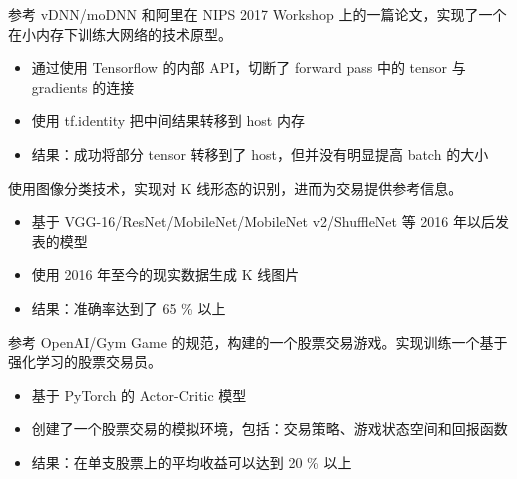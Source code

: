 \documentclass{resume}
\begin{document}
\begin{onehalfspacing}
参考 vDNN/moDNN 和阿里在 NIPS 2017 Workshop 上的一篇论文，实现了一个在小内存下训练大网络的技术原型。
\begin{itemize}
  \item 通过使用 Tensorflow 的内部 API，切断了 forward pass 中的 tensor 与 gradients 的连接
  \item 使用 tf.identity 把中间结果转移到 host 内存
  \item 结果：成功将部分 tensor 转移到了 host，但并没有明显提高 batch 的大小
\end{itemize}
\end{onehalfspacing}

\begin{onehalfspacing}
使用图像分类技术，实现对 K 线形态的识别，进而为交易提供参考信息。
\begin{itemize}
  \item 基于 VGG-16/ResNet/MobileNet/MobileNet v2/ShuffleNet 等 2016 年以后发表的模型
  \item 使用 2016 年至今的现实数据生成 K 线图片
  \item 结果：准确率达到了 65 \% 以上
\end{itemize}
\end{onehalfspacing}

\begin{onehalfspacing}
参考 OpenAI/Gym Game 的规范，构建的一个股票交易游戏。实现训练一个基于强化学习的股票交易员。
\begin{itemize}
  \item 基于 PyTorch 的 Actor-Critic 模型
  \item 创建了一个股票交易的模拟环境，包括：交易策略、游戏状态空间和回报函数
  \item 结果：在单支股票上的平均收益可以达到 20 \% 以上
\end{itemize}
\end{onehalfspacing}
\end{document}
